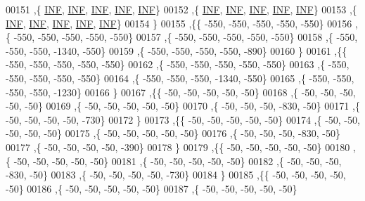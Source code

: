 \begin{DoxyCode}
00151   ,\{   \mbox{\hyperlink{energy__const_8h_a12c2040f25d8e3a7b9e1c2024c618cb6}{INF}},   \mbox{\hyperlink{energy__const_8h_a12c2040f25d8e3a7b9e1c2024c618cb6}{INF}},   \mbox{\hyperlink{energy__const_8h_a12c2040f25d8e3a7b9e1c2024c618cb6}{INF}},   \mbox{\hyperlink{energy__const_8h_a12c2040f25d8e3a7b9e1c2024c618cb6}{INF}},   \mbox{\hyperlink{energy__const_8h_a12c2040f25d8e3a7b9e1c2024c618cb6}{INF}}\}
00152   ,\{   \mbox{\hyperlink{energy__const_8h_a12c2040f25d8e3a7b9e1c2024c618cb6}{INF}},   \mbox{\hyperlink{energy__const_8h_a12c2040f25d8e3a7b9e1c2024c618cb6}{INF}},   \mbox{\hyperlink{energy__const_8h_a12c2040f25d8e3a7b9e1c2024c618cb6}{INF}},   \mbox{\hyperlink{energy__const_8h_a12c2040f25d8e3a7b9e1c2024c618cb6}{INF}},   \mbox{\hyperlink{energy__const_8h_a12c2040f25d8e3a7b9e1c2024c618cb6}{INF}}\}
00153   ,\{   \mbox{\hyperlink{energy__const_8h_a12c2040f25d8e3a7b9e1c2024c618cb6}{INF}},   \mbox{\hyperlink{energy__const_8h_a12c2040f25d8e3a7b9e1c2024c618cb6}{INF}},   \mbox{\hyperlink{energy__const_8h_a12c2040f25d8e3a7b9e1c2024c618cb6}{INF}},   \mbox{\hyperlink{energy__const_8h_a12c2040f25d8e3a7b9e1c2024c618cb6}{INF}},   \mbox{\hyperlink{energy__const_8h_a12c2040f25d8e3a7b9e1c2024c618cb6}{INF}}\}
00154   \}
00155  ,\{\{  -550,  -550,  -550,  -550,  -550\}
00156   ,\{  -550,  -550,  -550,  -550,  -550\}
00157   ,\{  -550,  -550,  -550,  -550,  -550\}
00158   ,\{  -550,  -550,  -550, -1340,  -550\}
00159   ,\{  -550,  -550,  -550,  -550,  -890\}
00160   \}
00161  ,\{\{  -550,  -550,  -550,  -550,  -550\}
00162   ,\{  -550,  -550,  -550,  -550,  -550\}
00163   ,\{  -550,  -550,  -550,  -550,  -550\}
00164   ,\{  -550,  -550,  -550, -1340,  -550\}
00165   ,\{  -550,  -550,  -550,  -550, -1230\}
00166   \}
00167  ,\{\{   -50,   -50,   -50,   -50,   -50\}
00168   ,\{   -50,   -50,   -50,   -50,   -50\}
00169   ,\{   -50,   -50,   -50,   -50,   -50\}
00170   ,\{   -50,   -50,   -50,  -830,   -50\}
00171   ,\{   -50,   -50,   -50,   -50,  -730\}
00172   \}
00173  ,\{\{   -50,   -50,   -50,   -50,   -50\}
00174   ,\{   -50,   -50,   -50,   -50,   -50\}
00175   ,\{   -50,   -50,   -50,   -50,   -50\}
00176   ,\{   -50,   -50,   -50,  -830,   -50\}
00177   ,\{   -50,   -50,   -50,   -50,  -390\}
00178   \}
00179  ,\{\{   -50,   -50,   -50,   -50,   -50\}
00180   ,\{   -50,   -50,   -50,   -50,   -50\}
00181   ,\{   -50,   -50,   -50,   -50,   -50\}
00182   ,\{   -50,   -50,   -50,  -830,   -50\}
00183   ,\{   -50,   -50,   -50,   -50,  -730\}
00184   \}
00185  ,\{\{   -50,   -50,   -50,   -50,   -50\}
00186   ,\{   -50,   -50,   -50,   -50,   -50\}
00187   ,\{   -50,   -50,   -50,   -50,   -50\}

\end{DoxyCode}
